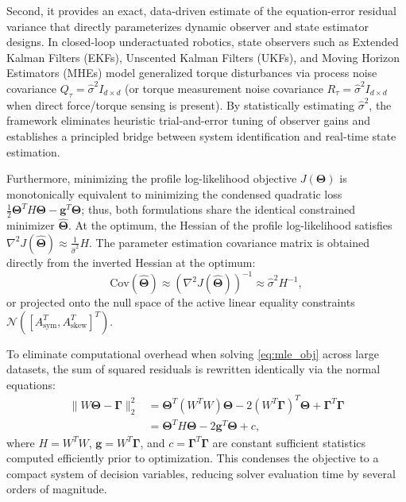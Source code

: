 \documentclass[lettersize,journal]{IEEEtran}
\begin{document}
Second, it provides an exact, data-driven estimate of the equation-error residual variance that directly parameterizes dynamic observer and state estimator designs. In closed-loop underactuated robotics, state observers such as Extended Kalman Filters (EKFs), Unscented Kalman Filters (UKFs), and Moving Horizon Estimators (MHEs) model generalized torque disturbances via process noise covariance $Q_\tau = \hat{\sigma}^2 I_{d \times d}$ (or torque measurement noise covariance $R_\tau = \hat{\sigma}^2 I_{d \times d}$ when direct force/torque sensing is present). By statistically estimating $\hat{\sigma}^2$, the framework eliminates heuristic trial-and-error tuning of observer gains and establishes a principled bridge between system identification and real-time state estimation.

Furthermore, minimizing the profile log-likelihood objective $J(\bm{\Theta})$ is monotonically equivalent to minimizing the condensed quadratic loss $\frac{1}{2}\bm{\Theta}^T H \bm{\Theta} - \bm{g}^T \bm{\Theta}$; thus, both formulations share the identical constrained minimizer $\hat{\bm{\Theta}}$. At the optimum, the Hessian of the profile log-likelihood satisfies $\nabla^2 J(\hat{\bm{\Theta}}) \approx \frac{1}{\hat{\sigma}^2} H$. The parameter estimation covariance matrix is obtained directly from the inverted Hessian at the optimum:
\begin{equation}
    \text{Cov}(\hat{\bm{\Theta}}) \approx \left( \nabla^2 J(\hat{\bm{\Theta}}) \right)^{-1} \approx \hat{\sigma}^2 H^{-1},
    \label{eq:param_cov}
\end{equation}
or projected onto the null space of the active linear equality constraints $\mathcal{N}([A_{\mathrm{sym}}^T, A_{\mathrm{skew}}^T]^T)$.

To eliminate computational overhead when solving \eqref{eq:mle_obj} across large datasets, the sum of squared residuals is rewritten identically via the normal equations:
\begin{align}
    \| W\bm{\Theta} - \bm{\Gamma} \|_2^2 &= \bm{\Theta}^T (W^T W) \bm{\Theta} - 2 (W^T \bm{\Gamma})^T \bm{\Theta} + \bm{\Gamma}^T \bm{\Gamma} \nonumber \\
    &= \bm{\Theta}^T H \bm{\Theta} - 2 \bm{g}^T \bm{\Theta} + c,
\end{align}
where $H = W^T W$, $\bm{g} = W^T \bm{\Gamma}$, and $c = \bm{\Gamma}^T \bm{\Gamma}$ are constant sufficient statistics computed efficiently prior to optimization. This condenses the objective to a compact system of decision variables, reducing solver evaluation time by several orders of magnitude.
\end{document}
